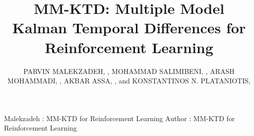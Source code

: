 \documentclass{ieeeaccess}
\begin{document}
\history{}%
\doi{}%

%
\title{MM-KTD: Multiple Model Kalman Temporal Differences for Reinforcement Learning}
\author{\uppercase{Parvin Malekzadeh}, ,
\uppercase{Mohammad Salimibeni}, ,
\uppercase{Arash Mohammadi}, ,
\uppercase{Akbar Assa}, , and
\uppercase{Konstantinos N. Plataniotis}, }
\address[1]{Concordia Institute for Information Systems Engineering,  Concordia University, Montreal, QC, Canada H3G-2W1}
\address[2]{Department of Electrical and Computer Engineering, University of Toronto, Toronto, ON, Canada}

\markboth
{Malekzadeh \headeretal: MM-KTD for Reinforcement Learning}
{Author \headeretal: MM-KTD for Reinforcement Learning}

\end{document}
